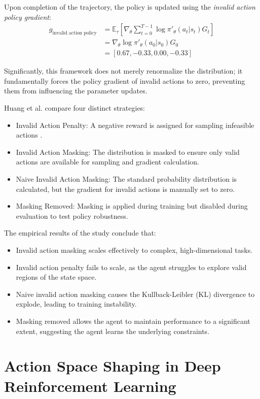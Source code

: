 \documentclass[a4paper]{scrartcl}
\begin{document}
Upon completion of the trajectory, the policy is updated using the \textit{invalid action policy gradient}:
\begin{align}
g_{\text{invalid action policy}} &= \mathbb{E}_{\tau} \left[ \nabla_{\theta} \sum_{t=0}^{T-1} \log \pi'_{\theta}(a_t|s_t)G_t \right]  \nonumber \\
&= \nabla_{\theta} \log \pi'_{\theta}(a_0|s_0)G_0 \nonumber \\
&= [0.67, -0.33, 0.00, -0.33]
\end{align}

Significantly, this framework does not merely renormalize the distribution; it fundamentally forces the policy gradient of invalid actions to zero, preventing them from influencing the parameter updates. 

Huang et al. compare four distinct strategies:
\begin{itemize}
    \item Invalid Action Penalty: A negative reward is assigned for sampling infeasible actions \cite{dietterich2000hierarchical}.
    \item Invalid Action Masking: The distribution is masked to ensure only valid actions are available for sampling and gradient calculation.
    \item Naive Invalid Action Masking: The standard probability distribution is calculated, but the gradient for invalid actions is manually set to zero.
    \item Masking Removed: Masking is applied during training but disabled during evaluation to test policy robustness.
\end{itemize}

The empirical results of the study conclude that:
\begin{itemize}
    \item Invalid action masking scales effectively to complex, high-dimensional tasks.
    \item Invalid action penalty fails to scale, as the agent struggles to explore valid regions of the state space.
    \item Naive invalid action masking causes the Kullback-Leibler (KL) divergence to explode, leading to training instability.
    \item Masking removed allows the agent to maintain performance to a significant extent, suggesting the agent learns the underlying constraints.
\end{itemize}

\section{Action Space Shaping in Deep Reinforcement Learning}
\end{document}
